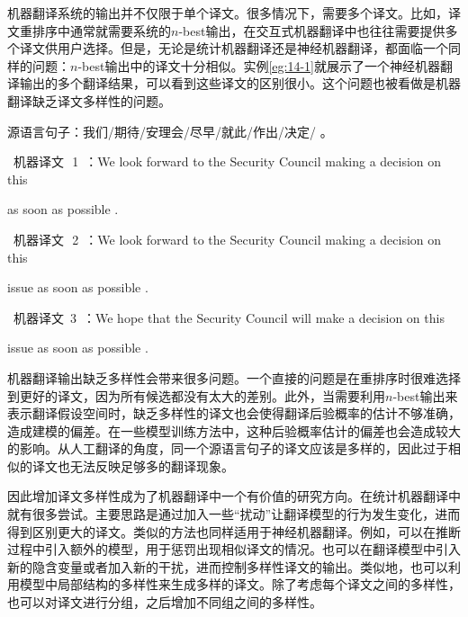 \parinterval 机器翻译系统的输出并不仅限于单个译文。很多情况下，需要多个译文。比如，译文重排序中通常就需要系统的$n$-best输出，在交互式机器翻译中也往往需要提供多个译文供用户选择。但是，无论是统计机器翻译还是神经机器翻译，都面临一个同样的问题：$n$-best输出中的译文十分相似。实例\ref{eg:14-1}就展示了一个神经机器翻译输出的多个翻译结果，可以看到这些译文的区别很小。这个问题也被看做是机器翻译缺乏译文多样性的问题。

\begin{example}
源语言句子：我们/期待/安理会/尽早/就此/作出/决定/ 。

\qquad\ 机器译文\ \,1\ ：We look forward to the Security Council making a decision on this

\hspace{8.3em}as soon as possible .

\qquad\ 机器译文\ \,2\ ：We look forward to the Security Council making a decision on this

\hspace{8.3em}issue as soon as possible .

\qquad\ 机器译文\ 3\ ：We hope that the Security Council will make a decision on this

\hspace{8.4em}issue as soon as possible .

\label{eg:14-1}
\end{example}

\parinterval  机器翻译输出缺乏多样性会带来很多问题。一个直接的问题是在重排序时很难选择到更好的译文，因为所有候选都没有太大的差别。此外，当需要利用$n$-best输出来表示翻译假设空间时，缺乏多样性的译文也会使得翻译后验概率的估计不够准确，造成建模的偏差。在一些模型训练方法中，这种后验概率估计的偏差也会造成较大的影响。从人工翻译的角度，同一个源语言句子的译文应该是多样的，因此过于相似的译文也无法反映足够多的翻译现象。

\parinterval 因此增加译文多样性成为了机器翻译中一个有价值的研究方向。在统计机器翻译中就有很多尝试。主要思路是通过加入一些“扰动”让翻译模型的行为发生变化，进而得到区别更大的译文。类似的方法也同样适用于神经机器翻译。例如，可以在推断过程中引入额外的模型，用于惩罚出现相似译文的情况。也可以在翻译模型中引入新的隐含变量或者加入新的干扰，进而控制多样性译文的输出。类似地，也可以利用模型中局部结构的多样性来生成多样的译文。除了考虑每个译文之间的多样性，也可以对译文进行分组，之后增加不同组之间的多样性。

